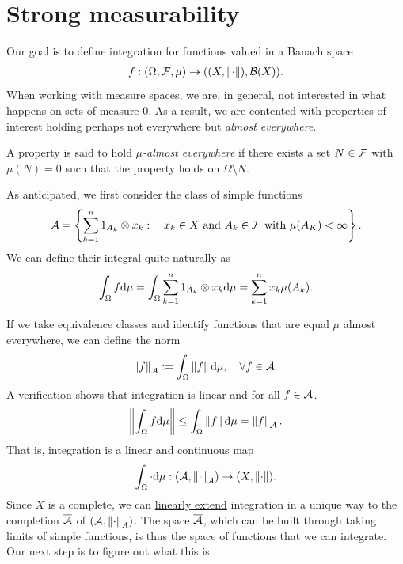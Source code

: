 \documentclass[
    a4paper,
    DIV=14,
    abstract=true,
    numbers=noenddot
]{scrartcl}
\begin{document}
\section{Strong measurability}\label{strong measurability sec}
Our goal is to define integration for functions valued in a Banach space
\begin{align*}
	f:(\Omega,\mathcal{F},\mu)\to ((X,\left\lVert \cdot \right\rVert),\mathcal{B}(X)).
\end{align*}
When working with measure spaces, we are, in general, not interested in what happens on sets of measure $0$. As a result, we are contented with properties of interest holding perhaps not everywhere but \emph{almost everywhere}.
\begin{definition}
	A property is said to hold \emph{$\mu $-almost everywhere} if there exists a set $N\in \mathcal{F}$ with $\mu(N)=0$ such that the property holds on $\Omega\setminus N$.
\end{definition}
As anticipated, we first consider the class of simple functions \begin{align*}
	\mathcal{A}=\left\{\sum_{k=1}^{n} 1_{A_k} \otimes x_k: \quad x_k\in X \text{ and } A_k \in \mathcal{F} \text{ with } \mu(A_K)< \infty\right\}.
\end{align*}
We can define their integral quite naturally as
\begin{align*}
	\int_\Omega f \mathrm{d}\mu=\int_\Omega \sum_{k=1}^{n} 1_{A_k} \otimes x_k\mathrm{d}\mu=\sum_{k=1}^n x_k\mu({A_k}).
\end{align*}

If we take equivalence classes and identify functions that are equal $\mu $ almost everywhere, we can define the norm
\begin{align*}
	\left\lVert f \right\rVert_{\mathcal{A}}:=\int_\Omega \left\lVert f \right\rVert \mathrm{d}\mu , \quad\forall f\in \mathcal{A}.
\end{align*}
A verification shows that integration is linear and for all $f\in\mathcal{A}$.
\begin{align}\label{triangle}
	\left\lVert \int_\Omega f \mathrm{d} \mu \right\rVert\leq\int_\Omega \left\lVert f \right\rVert \mathrm{d}\mu=\left\lVert f \right\rVert_{\mathcal{A}}.
\end{align}
That is, integration is a linear and continuous map
\begin{align*}
	\int_\Omega \cdot \mathrm{d}\mu : \left(\mathcal{A},\left\lVert \cdot \right\rVert_{\mathcal{A}} \right)\to (X,\left\lVert \cdot \right\rVert).
\end{align*}
Since $X$ is a complete, we can \href{https://en.wikipedia.org/wiki/Continuous_linear_extension}{linearly extend} integration in a unique way to the completion $\overline{\mathcal{A}}$ of $(\mathcal{A},\left\lVert \cdot \right\rVert_A)$. The space $\overline{\mathcal{A}}$, which can be built through taking limits of simple functions, is thus the space of functions that we can integrate. Our next step is to figure out what this is.
\end{document}
